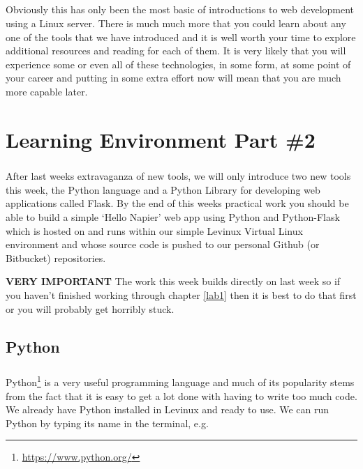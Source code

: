 \documentclass[12pt, a4paper, twoside]{book}
\begin{document}
\paragraph{} Obviously this has only been the most basic of introductions to web development using a Linux server. There is much much more that you could learn about any one of the tools that we have introduced and it is well worth your time to explore additional resources and reading for each of them. It is very likely that you will experience some or even all of these technologies, in some form, at some point of your career and putting in some extra effort now will mean that you are much more capable later.


\chapter{Learning Environment Part \#2}
\label{lab2}
\paragraph{} After last weeks extravaganza of new tools, we will only introduce two new tools this week, the Python language and a Python Library for developing web applications called Flask. By the end of this weeks practical work you should be able to build a simple `Hello Napier' web app using Python and Python-Flask which is hosted on and runs within our simple Levinux Virtual Linux environment and whose source code is pushed to our personal Github (or Bitbucket) repositories. 

\begin{framed}
\textbf{VERY IMPORTANT} The work this week builds directly on last week so if you haven't finished working through chapter \ref{lab1} then it is best to do that first or you will probably get horribly stuck.
\end{framed}

\section{Python}
\label{python}
\paragraph{} Python\footnote{\url{https://www.python.org/}} is a very useful programming language and much of its popularity stems from the fact that it is easy to get a lot done with having to write too much code. We already have Python installed in Levinux and ready to use. We can run Python by typing its name in the terminal, e.g.
\end{document}
